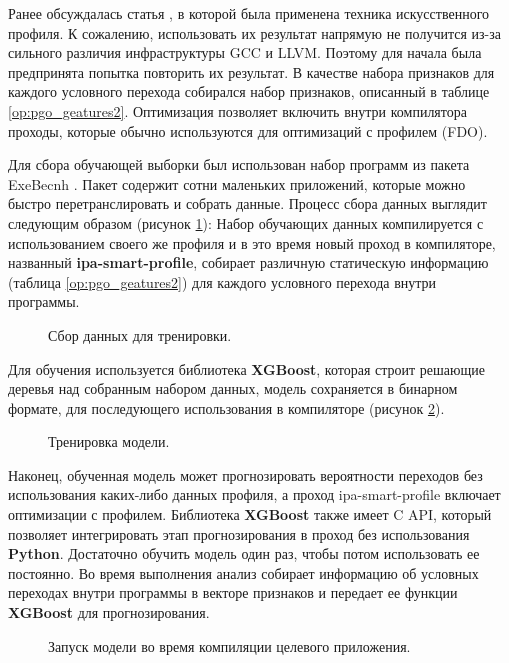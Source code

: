 Ранее обсуждалась статья  \cite{rotem2021profile}, в которой была применена техника искусственного профиля. К сожалению, использовать их результат напрямую не получится из-за сильного различия инфраструктуры  GCC и LLVM. Поэтому для начала была предпринята попытка повторить их результат. В качестве набора признаков для каждого условного перехода собирался набор признаков, описанный в таблице \ref{op:pgo_geatures2}. Оптимизация позволяет включить внутри компилятора проходы, которые обычно используются для оптимизаций с профилем (FDO). 

Для сбора обучающей выборки был использован набор программ из пакета ExeBecnh \cite{armengol2022exebench}. Пакет содержит сотни маленьких приложений, которые можно быстро перетранслировать и собрать данные. Процесс сбора данных выглядит следующим образом (рисунок \ref{op:mlpgo1}): Набор обучающих данных компилируется  с использованием своего же профиля и в это время новый проход в компиляторе, названный \textbf{ipa-smart-profile}, собирает различную статическую информацию (таблица \ref{op:pgo_geatures2}) для каждого условного перехода внутри программы. 

\begin{figure}[htbp]
	\centering
	
	\caption{Сбор данных для тренировки.}
	\label{op:mlpgo1}
\end{figure}

Для обучения используется библиотека \textbf{XGBoost}, которая строит решающие деревья над собранным набором данных, модель сохраняется в бинарном формате, для последующего использования в компиляторе (рисунок \ref{op:mlpgo2}).

\begin{figure}[htbp]
	\centering
	
	\caption{Тренировка модели.}
	\label{op:mlpgo2}
\end{figure}
Наконец, обученная модель может прогнозировать вероятности  переходов  без использования каких-либо данных профиля, а проход ipa-smart-profile включает оптимизации с профилем. Библиотека \textbf{XGBoost} также имеет C API, который позволяет интегрировать этап прогнозирования в проход без использования \textbf{Python}. Достаточно обучить модель один раз, чтобы потом использовать ее постоянно. Во время выполнения анализ собирает информацию об условных переходах  внутри программы в векторе признаков и передает ее функции \textbf{XGBoost} для прогнозирования.
\begin{figure}[htbp]
	\centering
	
	\caption{Запуск модели во время компиляции целевого приложения.}
	\label{op:mlpgo3}
\end{figure}

